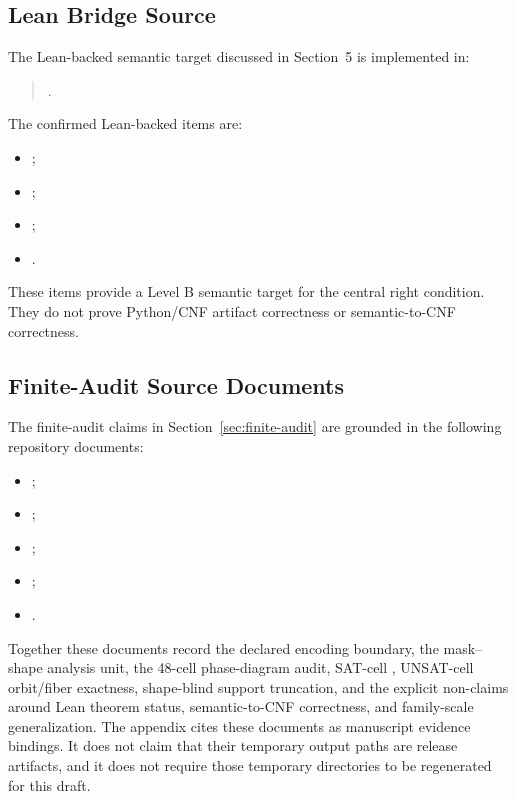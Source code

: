 \subsection{Lean Bridge Source}

The Lean-backed semantic target discussed in Section~5 is implemented in:

\begin{quote}
.
\end{quote}

The confirmed Lean-backed items are:

\begin{itemize}[leftmargin=*]
\item {};
\item {};
\item {};
\item {}.
\end{itemize}

These items provide a Level B semantic target for the central right condition.
They do not prove Python/CNF artifact correctness or semantic-to-CNF
correctness.

\subsection{Finite-Audit Source Documents}

The finite-audit claims in Section~\ref{sec:finite-audit} are grounded in the
following repository documents:

\begin{itemize}[leftmargin=*]
\item {};
\item {};
\item {};
\item {};
\item {}.
\end{itemize}

Together these documents record the declared encoding boundary, the
mask--shape analysis unit, the 48-cell phase-diagram audit, SAT-cell
, UNSAT-cell orbit/fiber exactness, shape-blind support
truncation, and the explicit non-claims around Lean theorem status,
semantic-to-CNF correctness, and family-scale generalization.
The appendix cites these documents as manuscript evidence bindings. It does
not claim that their temporary output paths are release artifacts, and it does
not require those temporary directories to be regenerated for this draft.

